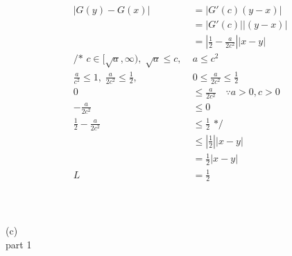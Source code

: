 \documentclass[12pt, border = 4pt, multi]{article} %
\begin{document}
\begin{align*}
|G(y) - G(x)| &= |G'(c)(y - x)|\\
&= |G'(c)||(y - x)|\\
&= \left|\frac{1}{2} - \frac{a}{2c ^ 2}\right||x - y|\\
\text{/* } c \in [\sqrt{a}, \infty),\; \sqrt{a} \leq c,\; &a \leq c ^ 2\\
\frac{a}{c ^ 2} \leq 1,\; \frac{a}{2c ^ 2} \leq \frac{1}{2},\; &0 \leq \frac{a}{2c ^ 2} \leq \frac{1}{2}\\
0 &\leq \frac{a}{2c ^ 2} \quad \because a > 0, c > 0\\
-\frac{a}{2c ^ 2} &\leq 0\\
\frac{1}{2} -\frac{a}{2c ^ 2} &\leq \frac{1}{2} \text{ */}\\
&\leq \left|\frac{1}{2}\right||x - y|\\
&= \frac{1}{2}|x - y|\\
L &= \frac{1}{2}
\end{align*}
\\
\\
\\
(c)\\
part 1
\end{document}
